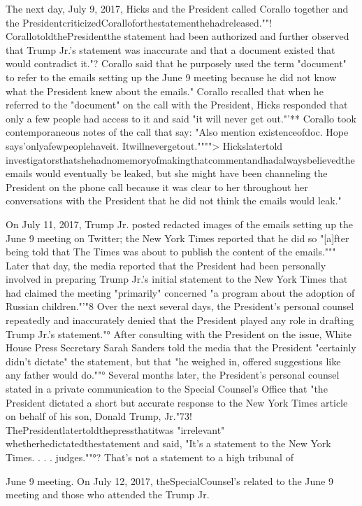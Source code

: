 The next day, July 9, 2017, Hicks and the President called Corallo together and the PresidentcriticizedCoralloforthestatementhehadreleased.""!
CorallotoldthePresidentthe statement had been authorized and further observed that Trump Jr.'s statement was inaccurate and that a document existed that would contradict it."?
Corallo said that he purposely used the term "document" to refer to the emails setting up the June 9 meeting because he did not know what the President knew about the emails."
Corallo recalled that when he referred to the "document" on the call with the President, Hicks responded that only a few people had access to it and said "it will never get out."'**
Corallo took contemporaneous notes of the call that say: "Also mention existenceofdoc.
Hope says'onlyafewpeoplehaveit.
Itwillnevergetout."""">
Hickslatertold investigatorsthatshehadnomemoryofmakingthatcommentandhadalwaysbelievedtheemails would eventually be leaked, but she might have been channeling the President on the phone call because it was clear to her throughout her conversations with the President that he did not think the emails would leak."

On July 11, 2017, Trump Jr. posted redacted images of the emails setting up the June 9 meeting on Twitter; the New York Times reported that he did so "[a]fter being told that The Times was about to publish the content of the emails."""
Later that day, the media reported that the President had been personally involved in preparing Trump Jr.'s initial statement to the New York Times that had claimed the meeting "primarily" concerned "a program about the adoption of Russian children."'"8
Over the next several days, the President's personal counsel repeatedly and inaccurately denied that the President played any role in drafting Trump Jr.'s statement."°
After consulting with the President on the issue, White House Press Secretary Sarah Sanders told the media that the President "certainly didn't dictate" the statement, but that "he weighed in, offered suggestions like any father would do.""°
Several months later, the President's personal counsel stated in a private communication to the Special Counsel's Office that "the President dictated a short but accurate response to the New York Times article on behalf of his son, Donald Trump,
Jr."73!
ThePresidentlatertoldthepressthatitwas "irrelevant" whetherhedictatedthestatement
and said, "It's a statement to the New York Times. . . . judges.""°?
That's not a statement to a high tribunal of

June 9 meeting.
On July 12, 2017, theSpecialCounsel's
related to the June 9 meeting and those who attended the
Trump Jr.

